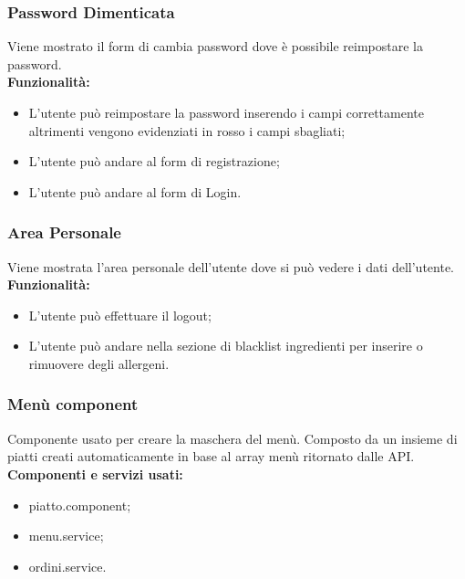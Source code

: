 \subsubsection{Password Dimenticata}
Viene mostrato il form di cambia password dove è possibile reimpostare la password.\\
\textbf{Funzionalità:}
\begin{itemize}
    \setlength\itemsep{.1em}
    \item L'utente può reimpostare la password inserendo i campi correttamente altrimenti vengono evidenziati in rosso i campi sbagliati;
    \item L'utente può andare al form di registrazione;
    \item L'utente può andare al form di Login.
\end{itemize}


\subsubsection{Area Personale}
Viene mostrata l'area personale dell'utente dove si può vedere i dati dell'utente.
\textbf{Funzionalità:}
\begin{itemize}
    \item L'utente può effettuare il logout;
    \item L'utente può andare nella sezione di blacklist ingredienti per inserire o rimuovere degli allergeni.
\end{itemize}

\label{cap:menu.component}

\subsubsection{Menù component}
Componente usato per creare la maschera del menù. Composto da un insieme di piatti creati automaticamente in base al array menù ritornato dalle API.\\
\textbf{Componenti e servizi usati:}
\begin{itemize}
    \item piatto.component;
    \item menu.service;
    \item ordini.service.
\end{itemize}

